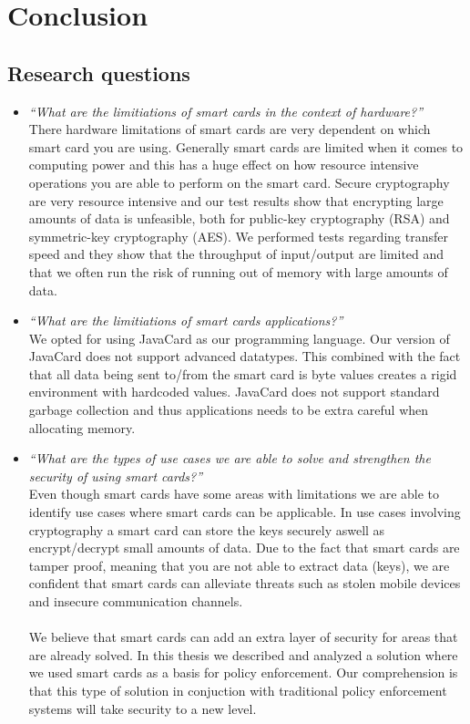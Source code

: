 \chapter{Conclusion}
\label{ch:conclusion}

\section{Research questions}
\begin{itemize}
  \item \textit{``What are the limitiations of smart cards in the context of hardware?''}\\
  There hardware limitations of smart cards are very dependent on which smart card you are using. Generally smart cards are limited when it comes to computing power and this has a huge effect on how resource intensive operations you are able to perform on the smart card. Secure cryptography are very resource intensive and our test results show that encrypting large amounts of data is unfeasible, both for public-key cryptography (RSA) and symmetric-key cryptography (AES). We performed tests regarding transfer speed and they show that the throughput of input/output are limited and that we often run the risk of running out of memory with large amounts of data.
  \item \textit{``What are the limitiations of smart cards applications?''}\\
  We opted for using JavaCard as our programming language. Our version of JavaCard does not support advanced datatypes. This combined with the fact that all data being sent to/from the smart card is byte values creates a rigid environment with hardcoded values. JavaCard does not support standard garbage collection and thus applications needs to be extra careful when allocating memory.
  \item \textit{``What are the types of use cases we are able to solve and strengthen the security of using smart cards?''}\\
  Even though smart cards have some areas with limitations we are able to identify use cases where smart cards can be applicable. In use cases involving cryptography a smart card can store the keys securely aswell as encrypt/decrypt small amounts of data. Due to the fact that smart cards are tamper proof, meaning that you are not able to extract data (keys), we are confident that smart cards can alleviate threats such as stolen mobile devices and insecure communication channels.\mbox{}\\\\  We believe that smart cards can add an extra layer of security for areas that are already solved. In this thesis we described and analyzed a solution where we used smart cards as a basis for policy enforcement. Our comprehension is that this type of solution in conjuction with traditional policy enforcement systems will take security to a new level.
\end{itemize}



